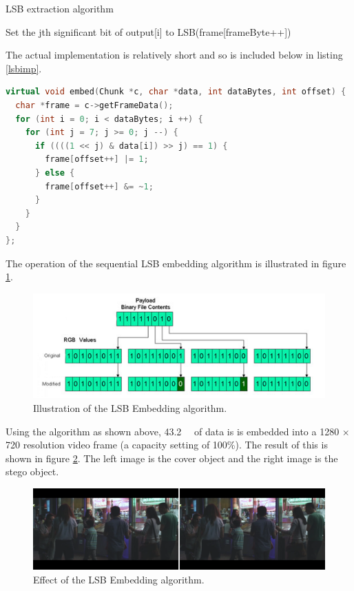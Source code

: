 \documentclass[paper=a4, fontsize=11pt,twoside]{scrartcl}
\numberwithin{table}{section}
\numberwithin{figure}{section}
\numberwithin{algorithm}{section}
\begin{document}
\begin{algorithm}[!htb]
\caption{LSB extraction algorithm}
\label{lsbext}
\begin{algorithmic}[1]
		\State Set the jth significant bit of output[i] to LSB(frame[frameByte++]) 
	\EndFor
\EndFor
\end{algorithmic}
\end{algorithm}

\noindent
The actual implementation is relatively short and so is included below in listing \ref{lsbimp}.

\begin{lstlisting}[language=C++, caption={LSB implementation (\texttt{steg/lsb\_algorithm.cc:8})}, frame=single, label=lsbimp]
virtual void embed(Chunk *c, char *data, int dataBytes, int offset) {
  char *frame = c->getFrameData();
  for (int i = 0; i < dataBytes; i ++) {
    for (int j = 7; j >= 0; j --) {
      if ((((1 << j) & data[i]) >> j) == 1) {
        frame[offset++] |= 1;
      } else {
        frame[offset++] &= ~1;
      }
    }
  }
};
\end{lstlisting}

\noindent
The operation of the sequential LSB embedding algorithm is illustrated in figure \ref{lsbill}.

\begin{figure}[!htb]
\centerline{\includegraphics[width=\textwidth]{images/lsb_ill.png}}
\caption{Illustration of the LSB Embedding algorithm.}
\label{lsbill}
\end{figure}

Using the algorithm as shown above, \SI{43.2}{\kilo\byte} of data is is embedded into a 1280 $\times$ 720 resolution video frame (a capacity setting of 100\%). The result of this is shown in figure \ref{lsbemb_full}. The left image is the cover object and the right image is the stego object. 

\begin{figure}[!h]
\centerline{\includegraphics[width=\textwidth]{images/lsb_emb_full.png}}
\caption{Effect of the LSB Embedding algorithm.}
\label{lsbemb_full}
\end{figure}
\end{document}

